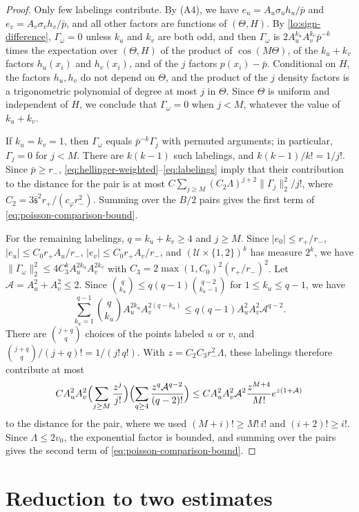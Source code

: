 \begin{proof}
Only few labelings contribute. By (A4), we have
$e_u=A_u\sigma_uh_u/\bar p$ and $e_v=A_v\sigma_vh_v/\bar p$, and all
other factors are functions of $(\Theta,H)$. By
\eqref{lo:sign-difference}, $\Gamma_\omega=0$ unless $k_u$ and $k_v$
are both odd, and then $\Gamma_\omega$ is
$2A_u^{k_u}A_v^{k_v}\bar p^{-k}$ times the expectation over
$(\Theta,H)$ of the product of $\cos(M\Theta)$, of the $k_u+k_v$ factors
$h_u(x_i)$ and $h_v(x_i)$, and of the $j$ factors $p(x_i)-\bar p$.
Conditional on $H$, the factors $h_u,h_v$ do not depend on $\Theta$, and
the product of the $j$ density factors is a trigonometric polynomial of
degree at most $j$ in $\Theta$. Since $\Theta$ is uniform and
independent of $H$, we conclude that $\Gamma_\omega=0$ when $j<M$,
whatever the value of $k_u+k_v$.

If $k_u=k_v=1$, then $\Gamma_\omega$ equals $\bar p^{-k}\Gamma_j$ with
permuted arguments; in particular, $\Gamma_j=0$ for $j<M$. There are
$k(k-1)$ such labelings, and $k(k-1)/k!=1/j!$. Since $\bar p\ge r_-$,
\eqref{eq:hellinger-weighted}--\eqref{eq:labelings} imply that their
contribution to the distance for the pair is at most
$C\sum_{j\ge M}(C_2\Lambda)^{j+2}\|\Gamma_j\|_2^2/j!$, where
$C_2=3\bar{\mathsf s}^2r_+/(c_\varphi r_-^2)$. Summing over the $B/2$
pairs gives the first term of \eqref{eq:poisson-comparison-bound}.

For the remaining labelings, $q=k_u+k_v\ge4$ and $j\ge M$. Since
$|e_0|\le r_+/r_-$, $|e_u|\le C_0r_+A_u/r_-$, $|e_v|\le C_0r_+A_v/r_-$,
and $(\mathcal U\times\{1,2\})^k$ has measure $2^k$, we have
$\|\Gamma_\omega\|_2^2\le4C_3^kA_u^{2k_u}A_v^{2k_v}$ with
$C_3=2\max(1,C_0)^2(r_+/r_-)^2$. Let $\mathcal A=A_u^2+A_v^2\le2$.
Since $\binom q{k_u}\le q(q-1)\binom{q-2}{k_u-1}$ for
$1\le k_u\le q-1$, we have
\[
 \sum_{k_u=1}^{q-1}\binom q{k_u}A_u^{2k_u}A_v^{2(q-k_u)}
 \le q(q-1)A_u^2A_v^2\mathcal A^{q-2}.
\]
There are $\binom{j+q}q$ choices of the points labeled $u$ or $v$, and
$\binom{j+q}q/(j+q)!=1/(j!\,q!)$. With $z=C_2C_3r_-^2\Lambda$, these
labelings therefore contribute at most
\[
 CA_u^2A_v^2\Bigl(\sum_{j\ge M}\frac{z^j}{j!}\Bigr)
 \Bigl(\sum_{q\ge4}\frac{z^q\mathcal A^{q-2}}{(q-2)!}\Bigr)
 \le CA_u^2A_v^2\mathcal A^2\frac{z^{M+4}}{M!}e^{z(1+\mathcal A)}
\]
to the distance for the pair, where we used $(M+i)!\ge M!\,i!$ and
$(i+2)!\ge i!$. Since $\Lambda\le2v_0$, the exponential factor is
bounded, and summing over the pairs gives the second term of
\eqref{eq:poisson-comparison-bound}.
\end{proof}

\section{Reduction to two estimates}\label{sec:lower-reduction}

